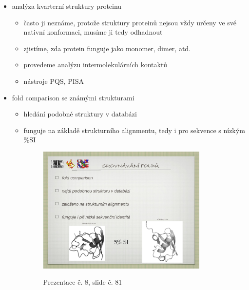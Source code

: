 \documentclass[DIV=8]{scrreprt}
\begin{document}
\begin{itemize}[nosep]
    \item analýza kvarterní struktury proteinu
\begin{itemize}[nosep]
    \item často ji neznáme, protože struktury proteinů nejsou vždy určeny ve své nativní konformaci, musíme ji tedy odhadnout
    \item zjistíme, zda protein funguje jako monomer, dimer, atd.
    \item provedeme analýzu intermolekulárních kontaktů
    \item nástroje PQS, PISA
\end{itemize}

    \item fold comparison se známými strukturami
\begin{itemize}[nosep]
    \item hledání podobné struktury v databázi
    \item funguje na základě strukturního alignmentu, tedy i pro sekvence s nízkým \%SI \begin{figure}
    \caption{Prezentace č. 8, slide č. 81}
    \includegraphics[width=0.85\textwidth]{slides-8/slide-81.jpg}
    \centering
    \label{slides-8-slide-81}
\end{figure}


\end{itemize}
\end{itemize}
\end{document}
